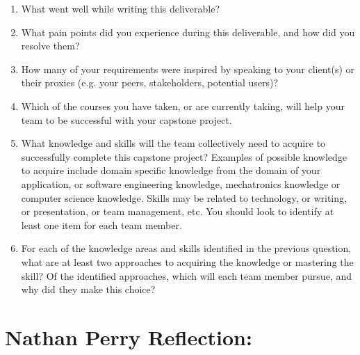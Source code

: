 \begin{enumerate}
  \item What went well while writing this deliverable? 
  \item What pain points did you experience during this deliverable, and how did
  you resolve them?
  \item How many of your requirements were inspired by speaking to your
  client(s) or their proxies (e.g. your peers, stakeholders, potential users)?
  \item Which of the courses you have taken, or are currently taking, will help
  your team to be successful with your capstone project.
  \item What knowledge and skills will the team collectively need to acquire to
  successfully complete this capstone project?  Examples of possible knowledge
  to acquire include domain specific knowledge from the domain of your
  application, or software engineering knowledge, mechatronics knowledge or
  computer science knowledge.  Skills may be related to technology, or writing,
  or presentation, or team management, etc.  You should look to identify at
  least one item for each team member.
  \item For each of the knowledge areas and skills identified in the previous
  question, what are at least two approaches to acquiring the knowledge or
  mastering the skill?  Of the identified approaches, which will each team
  member pursue, and why did they make this choice?
\end{enumerate}


\section{Nathan Perry Reflection:}

